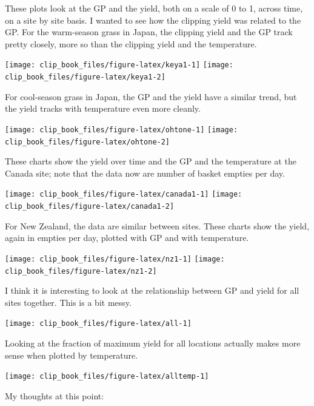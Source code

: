 \documentclass[12pt,b5,]{tufte-book}
\begin{document}
These plots look at the GP and the yield, both on a scale of 0 to 1, across time, on a site by site basis. I wanted to see how the clipping yield was related to the GP. For the warm-season grass in Japan, the clipping yield and the GP track pretty closely, more so than the clipping yield and the temperature.

\texttt{[image: clip\_book\_files/figure-latex/keya1-1]}
\texttt{[image: clip\_book\_files/figure-latex/keya1-2]}

For cool-season grass in Japan, the GP and the yield have a similar trend, but the yield tracks with temperature even more cleanly.

\texttt{[image: clip\_book\_files/figure-latex/ohtone-1]}
\texttt{[image: clip\_book\_files/figure-latex/ohtone-2]}

These charts show the yield over time and the GP and the temperature at the Canada site; note that the data now are number of basket empties per day.

\texttt{[image: clip\_book\_files/figure-latex/canada1-1]}
\texttt{[image: clip\_book\_files/figure-latex/canada1-2]}

For New Zealand, the data are similar between sites. These charts show the yield, again in empties per day, plotted with GP and with temperature.

\texttt{[image: clip\_book\_files/figure-latex/nz1-1]}
\texttt{[image: clip\_book\_files/figure-latex/nz1-2]}

I think it is interesting to look at the relationship between GP and yield for all sites together. This is a bit messy.

\texttt{[image: clip\_book\_files/figure-latex/all-1]}

Looking at the fraction of maximum yield for all locations actually makes more sense when plotted by temperature.

\texttt{[image: clip\_book\_files/figure-latex/alltemp-1]}

My thoughts at this point:
\end{document}
